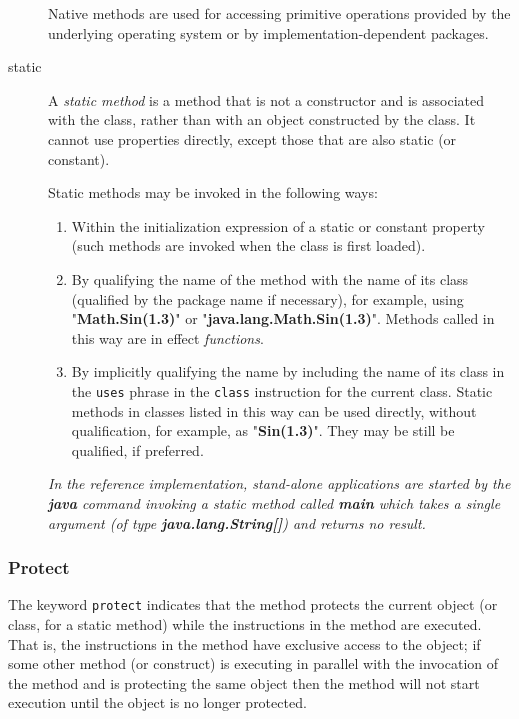 \begin{description}
Native methods are used for accessing primitive operations provided by
the underlying operating system or by implementation-dependent packages.
\index{,}
\index{,}
\item[static]\label{refstatmet}

A \emph{static method} is a method that is not a constructor and is
associated with the class, rather than with an object constructed by the
class.
It cannot use properties directly, except those that are also static (or
constant).
 
Static methods may be invoked in the following ways:
\begin{enumerate}
\item Within the initialization expression of a static or constant
property (such methods are invoked when the class is first loaded).
\item By qualifying the name of the method with the name of its class
(qualified by the package name if necessary), for example, using
"\textbf{Math.Sin(1.3)}" or
"\textbf{java.lang.Math.Sin(1.3)}".
Methods called in this way are in effect \emph{functions}.
\item 
By implicitly qualifying the name by including the name of its class
in the \texttt{uses} phrase in the \texttt{class} instruction for the
current class.  Static methods in classes listed in this way can be used
directly, without qualification, for example, as
"\textbf{Sin(1.3)}".
They may be still be qualified, if preferred.
\end{enumerate}
 \emph{In the reference implementation, stand-alone applications are
started by the \textbf{java} command invoking a static method
called \textbf{main} which takes a single argument (of
type \textbf{java.lang.String[]}) and returns no result.
}
\end{description}
\subsubsection{Protect}
 
The keyword \texttt{protect} indicates that the method protects the
current object (or class, for a static method) while the instructions
in the method are executed.
That is, the instructions in the method have exclusive access to the
object; if some other method (or construct) is executing in
parallel with the invocation of the method and is protecting the same
object then the method will not start execution until the object is no
longer protected.
 
